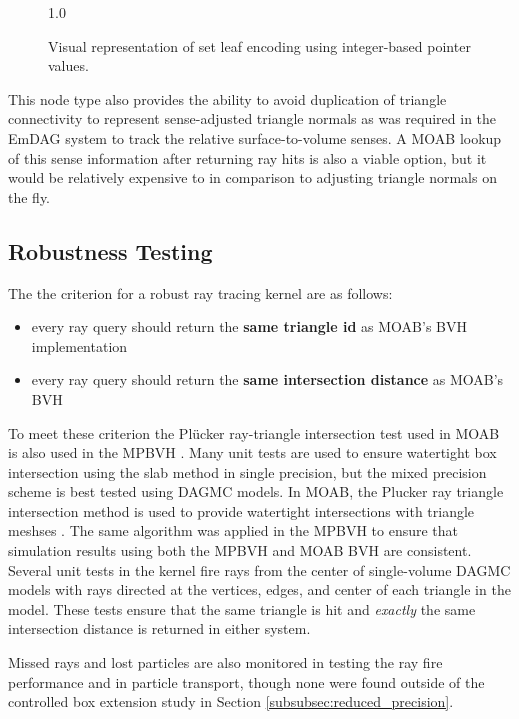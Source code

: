 \begin{figure}
  {1.0\textwidth}
  \caption{Visual representation of set leaf encoding using integer-based
    pointer values.}
  \label{fig:set_leaf_encoding}
\end{figure}

This node type also provides the ability to avoid duplication of triangle
connectivity to represent sense-adjusted triangle normals as was required in the
EmDAG system to track the relative surface-to-volume senses. A MOAB lookup of
this sense information after returning ray hits is also a viable option, but it
would be relatively expensive to in comparison to adjusting triangle normals on
the fly.

\subsection{Robustness Testing}

The the criterion for a robust ray tracing kernel are as follows:

\begin{itemize}
  \item every ray query should return the \textbf{same triangle id} as MOAB's BVH
    implementation
  \item every ray query should return the \textbf{same intersection distance} as MOAB's BVH
\end{itemize}

To meet these criterion the Pl\"{u}cker ray-triangle intersection test used in
MOAB is also used in the MPBVH \cite{Platis_2003}. Many unit tests are used to
ensure watertight box intersection using the slab method \cite{Kay_1986} in
single precision, but the mixed precision scheme is best tested using DAGMC
models. In MOAB, the Plucker ray triangle intersection method is used to provide
watertight intersections with triangle meshses \cite{Platis_2003}. The same
algorithm was applied in the MPBVH to ensure that simulation results using both
the MPBVH and MOAB BVH are consistent. Several unit tests in the kernel fire
rays from the center of single-volume DAGMC models with rays directed at
the vertices, edges, and center of each triangle in the model. These tests
ensure that the same triangle is hit and \textit{exactly} the same intersection
distance is returned in either system.

Missed rays and lost particles are also monitored in testing the ray fire
performance and in particle transport, though none were found outside of the
controlled box extension study in Section \ref{subsubsec:reduced_precision}.


